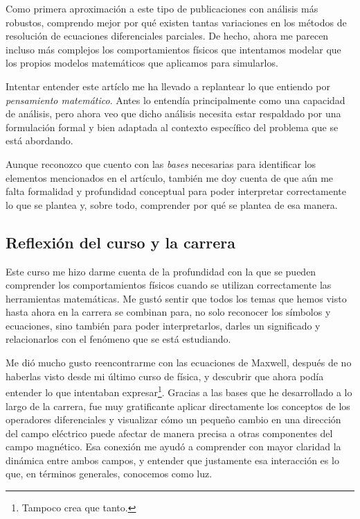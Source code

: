 \documentclass[10pt,a4paper]{article}
\begin{document}
Como primera aproximación a este tipo de publicaciones con análisis más robustos, comprendo mejor por qué existen tantas variaciones en los métodos de resolución de ecuaciones diferenciales parciales. De hecho, ahora me parecen incluso más complejos los comportamientos físicos que intentamos modelar que los propios modelos matemáticos que aplicamos para simularlos.

Intentar entender este artíclo me ha llevado a replantear lo que entiendo por \textit{pensamiento matemático}. Antes lo entendía principalmente como una capacidad de análisis, pero ahora veo que dicho análisis necesita estar respaldado por una formulación formal y bien adaptada al contexto específico del problema que se está abordando.

Aunque reconozco que cuento con las \textit{bases} necesarias para identificar los elementos mencionados en el artículo, también me doy cuenta de que aún me falta formalidad y profundidad conceptual para poder interpretar correctamente lo que se plantea y, sobre todo, comprender por qué se plantea de esa manera.


\subsection{Reflexión del curso y la carrera}

Este curso me hizo darme cuenta de la profundidad con la que se pueden comprender los comportamientos físicos cuando se utilizan correctamente las herramientas matemáticas. Me gustó sentir que todos los temas que hemos visto hasta ahora en la carrera se combinan para, no solo reconocer los símbolos y ecuaciones, sino también para poder interpretarlos, darles un significado y relacionarlos con el fenómeno que se está estudiando.

Me dió mucho gusto reencontrarme con las ecuaciones de Maxwell, después de no haberlas visto desde mi último curso de física, y descubrir que ahora podía entender lo que intentaban expresar\footnote{Tampoco crea que tanto.}. Gracias a las bases que he desarrollado a lo largo de la carrera, fue muy gratificante aplicar directamente los conceptos de los operadores diferenciales y visualizar cómo un pequeño cambio en una dirección del campo eléctrico puede afectar de manera precisa a otras componentes del campo magnético. Esa conexión me ayudó a comprender con mayor claridad la dinámica entre ambos campos, y entender que justamente esa interacción es lo que, en términos generales, conocemos como luz.
\end{document}

